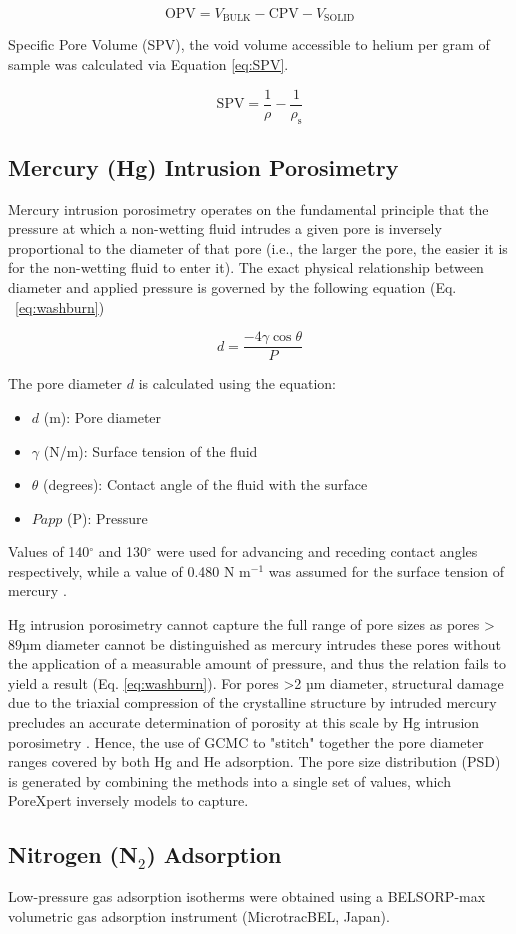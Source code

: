 \documentclass[3p,twocolumn]{elsarticle}
\begin{document}
\begin{equation}
	\mathrm{OPV} = V_{\mathrm{BULK}} - \mathrm{CPV} - V_{\mathrm{SOLID}}\label{eq:OPV} 
\end{equation}

Specific Pore Volume (SPV), the void volume accessible to helium per gram of
sample was calculated via Equation \ref{eq:SPV}. 

\begin{equation}
\mathrm{SPV} = \frac{1}{\rho}-\frac{1}{\rho_\mathrm{s}}\label{eq:SPV} 
\end{equation}

\subsection{Mercury (Hg) Intrusion Porosimetry}
Mercury intrusion porosimetry operates on the fundamental principle that the
pressure at which a non-wetting fluid intrudes a given pore is inversely
proportional to the diameter of that pore (i.e., the larger the pore, the easier
it is for the non-wetting fluid to enter it). The exact physical relationship
between diameter and applied pressure is governed by the following equation (Eq.
~\ref{eq:washburn})
	
	\begin{equation} \label{eq:washburn}
		d = \frac{-4\gamma \cos \theta}{P}
	\end{equation}

		The pore diameter \(d\) is calculated using the equation:
	\begin{itemize}
		\item $d$ (m): Pore diameter
		\item $\gamma$ (N/m): Surface tension of the fluid
		\item $\theta$ (degrees): Contact angle of the fluid with the surface
		\item $Papp$ (P): Pressure
	\end{itemize}

Values of 140$^{\circ}$ and 130$^{\circ}$ were used for advancing and receding
contact angles respectively, while a value of 0.480 N m$^{-1}$ was assumed for the
surface tension of mercury \citep{VANBRAKEL19811}. 

Hg intrusion porosimetry cannot capture the full range of pore sizes as pores >
89µm diameter cannot be distinguished as mercury intrudes these
pores without the application of a measurable amount of pressure, and thus the
relation fails to yield a result (Eq. \ref{eq:washburn}). For pores
>2 µm diameter, structural damage due to the triaxial compression of the
crystalline structure by intruded mercury precludes an accurate determination of
porosity at this scale by Hg intrusion porosimetry \citep{Jones2018}. Hence, the
use of GCMC to "stitch" together the pore diameter ranges covered by both Hg and
He adsorption. The pore size distribution (PSD) is generated by combining the
methods into a single set of values, which PoreXpert inversely models to
capture. 

\subsection{Nitrogen (N$_2$) Adsorption}
Low-pressure gas adsorption isotherms were obtained using a BELSORP-max
volumetric gas adsorption instrument (MicrotracBEL, Japan). 

\clearpage


\end{document}
